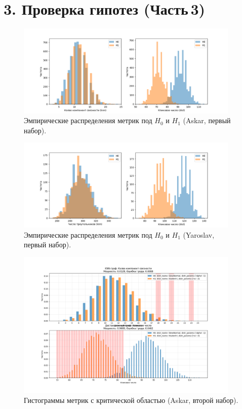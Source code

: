 \documentclass[a4paper,12pt]{article}
\begin{document}
\section*{3. Проверка гипотез (Часть\,3)}

\begin{figure}[H]
    \centering
    \includegraphics[width=0.95\textwidth]{Graphics/part3_results_0_Askar.png}
    \caption{Эмпирические распределения метрик под $H_0$ и $H_1$ (Askar, первый набор).}
    \label{fig:part3-0-askar}
\end{figure}

\begin{figure}[H]
    \centering
    \includegraphics[width=0.95\textwidth]{Graphics/part3_results_0_Yaroslav.png}
    \caption{Эмпирические распределения метрик под $H_0$ и $H_1$ (Yaroslav, первый набор).}
    \label{fig:part3-0-yaroslav}
\end{figure}

\begin{figure}[H]
    \centering
    \includegraphics[width=0.95\textwidth]{Graphics/part3_results_1_Askar.png}
    \caption{Гистограммы метрик с критической областью (Askar, второй набор).}
    \label{fig:part3-1-askar}
\end{figure}
\end{document}

